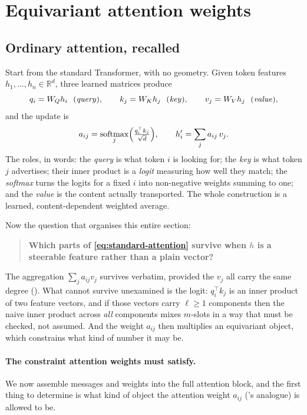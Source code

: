 \documentclass[11pt,a4paper]{report}
\theoremstyle{definition}
\theoremstyle{remark}
\newcommand{\RR}{\mathbb R}
\begin{document}
\section{Equivariant attention weights}
\label{sec:equiformer-attention}

\subsection{Ordinary attention, recalled}
\label{sec:attention-recap}

Start from the standard Transformer, with no geometry. Given token features
$h_1,\dots,h_n\in\RR^d$, three learned matrices produce
\[
q_i = W_Q h_i \ \ (\text{\emph{query}}),
\qquad
k_j = W_K h_j \ \ (\text{\emph{key}}),
\qquad
v_j = W_V h_j \ \ (\text{\emph{value}}),
\]
and the update is
\begin{equation}
\label{eq:standard-attention}
a_{ij} = \operatorname*{softmax}_{j}\Bigl(\tfrac{q_i^\top k_j}{\sqrt d}\Bigr),
\qquad
h_i' = \sum_j a_{ij}\,v_j .
\end{equation}
The roles, in words: the \emph{query} is what token $i$ is looking for; the
\emph{key} is what token $j$ advertises; their inner product is a
\emph{logit} measuring how well they match; the \emph{softmax} turns the
logits for a fixed $i$ into non-negative weights summing to one; and the
\emph{value} is the content actually transported. The whole construction is
a learned, content-dependent weighted average.

Now the question that organises this entire section:

\begin{quote}
\textbf{Which parts of \eqref{eq:standard-attention} survive when $h$ is a
steerable feature rather than a plain vector?}
\end{quote}

The aggregation $\sum_j a_{ij}v_j$ survives verbatim, provided the $v_j$ all
carry the same degree (). What cannot
survive unexamined is the logit: $q_i^\top k_j$ is an inner product of two
feature vectors, and if those vectors carry $\ell\ge1$ components then the
naive inner product across \emph{all} components mixes $m$-slots in a way
that must be checked, not assumed. And the weight $a_{ij}$ then multiplies an
equivariant object, which constrains what kind of number it may be.

\paragraph{The constraint attention weights must satisfy.} We now assemble
messages and weights into the full attention block, and the first thing to
determine is what kind of object the attention weight $a_{ij}$
('s analogue) is allowed to be.
\end{document}
